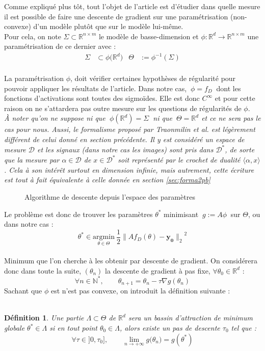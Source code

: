 \documentclass[hidelinks, french]{article} %
\newcommand{\N}{\mathbb{N}}
\newcommand{\R}{\mathbb{R}}
\newcommand{\lr}{\longrightarrow}
\newcommand{\etal}{\textit{et al. }}
\newcommand{\argmin}[1]{\underset{#1}{\text{argmin}}}
\renewcommand{\bf}[1]{\boldsymbol{#1}}
\theoremstyle{enonce}
\newtheorem{definition}{Définition}
\theoremstyle{special}
\theoremstyle{rq}
\theoremstyle{exo}
\theoremstyle{demo}
\begin{document}
Comme expliqué plus tôt, tout l'objet de l'article \cite{traonmilin_basins_2022} est d'étudier dans quelle mesure il est possible de faire une descente de gradient sur une paramétrisation (non-convexe) d'un modèle plutôt que sur le modèle lui-même. 
\\
Pour cela, on note $\Sigma\subset\R^{n\times m}$ le modèle de basse-dimension et $\phi: \R^d\lr\R^{n\times m}$ une paramétrisation de ce dernier avec :
\begin{align*}\Sigma&\subset\phi\big(\R^d\big)  &  \Theta&:=\phi^{-1}(\Sigma)\end{align*}
\\
La paramétrisation $\phi$, doit vérifier certaines hypothèses de régularité pour pouvoir appliquer les résultats de l'article. Dans notre cas, $\ \phi=f_D\ $ dont les fonctions d'activations sont toutes des sigmoïdes. Elle est donc $C^{\infty}$ et pour cette raison on ne s'attardera pas outre mesure sur les questions de régularités de $\phi$.
\\

\textit{\`A noter qu'on ne suppose ni que $\ \phi(\R^d)=\Sigma\ $ ni que  $\ \Theta=\R^d$ et ce ne sera pas le cas pour nous. Aussi, le formalisme proposé par Traonmilin \etal est légèrement différent de celui donné en section précédente. Il y est considéré un espace de mesure $\mathcal{D}$ et les signaux (dans notre cas les images) sont pris dans $\mathcal{D}^*$, de sorte que la mesure par $\alpha\in\mathcal{D}$ de $x\in\mathcal{D}^*$ soit représenté par le crochet de dualité $\langle \alpha,x\rangle$. Cela à son intérêt surtout en dimension infinie, mais autrement, cette écriture est tout à fait équivalente à celle donnée en section \ref{sec:forma2pb}}
\\

\begin{wrapfigure}{r}{0.43\textwidth}
    
    \caption{Algorithme de descente depuis l'espace des paramètres}
    \label{fig:pcode LGD}
\end{wrapfigure}

Le problème est donc de trouver les paramètres $\theta^*$ minimisant $\ g:=A\phi\ $ sur $\Theta$, ou dans notre cas :
\[\theta^*\in\argmin{\theta\in\Theta}\ \frac{1}{2}{\big\|Af_D(\theta)-\bf{y_0}\big\|_2}^2\]
\\
Minimum que l'on cherche à les obtenir par descente de gradient. On considérera donc dans toute la suite, $(\theta_n)$ la descente de gradient à pas fixe, $\forall\theta_0\in\R^d$ :
\[\forall n\in\N^*,\qquad \theta_{n+1} = \theta_n - \tau\nabla g(\theta_n)\]
Sachant que $\phi$ est n'est pas convexe, on introduit la définition suivante :
\\ \\
\begin{definition} 
Une partie $\Lambda\subset\Theta$ de $\R^d$ sera un \emph{bassin d'attraction} de minimum globale $\theta^*\in\Lambda$ si en tout point $\theta_0\in\Lambda$, alors existe un pas de descente $\tau_0$ tel que :
\[\forall \tau\in]0,\tau_0],\qquad \lim_{n\lr+\infty}g\big(\theta_n\big)=g(\theta^*)\]
\end{definition}
\end{document}
